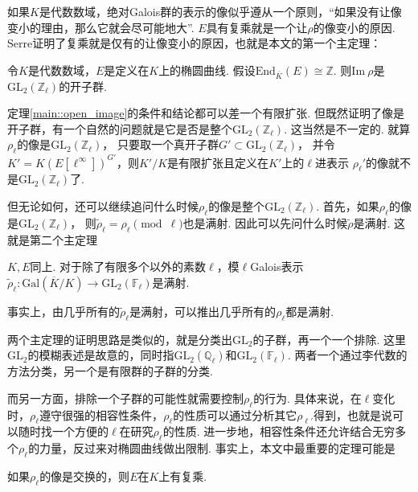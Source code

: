 如果$K$是代数数域，绝对Galois群的表示的像似乎遵从一个原则，“如果没有让像变小的理由，那么它就会尽可能地大”. $E$具有复乘就是一个让$\rho$的像变小的原因. Serre证明了复乘就是仅有的让像变小的原因，也就是本文的第一个主定理：

\begin{cthm}
    令$K$是代数数域，$E$是定义在$K$上的椭圆曲线. 假设$\mathrm{End}_{\overline{K}}(E) \cong \mathbb{Z}$. 则$\mathrm{Im}\ \rho$是$\mathrm{GL}_2(\mathbb{Z}_{\ell})$的开子群. \label{main::open_image}
\end{cthm}

定理\ref{main::open_image}的条件和结论都可以差一个有限扩张.
但既然证明了像是开子群，有一个自然的问题就是它是否是整个$\mathrm{GL}_2(\mathbb{Z}_{\ell})$.
这当然是不一定的. 就算$\rho_{\ell}$的像是$\mathrm{GL}_2(\mathbb{Z}_{\ell})$，
只要取一个真开子群$G'\subset \mathrm{GL}_2(\mathbb{Z}_{\ell})$，
并令$K' = K(E[\ell^{\infty}])^{G'}$，则$K'/K$是有限扩张且定义在$K'$上的$\ell$进表示
$\rho_{\ell}'$的像就不是$\mathrm{GL}_2(\mathbb{Z}_{\ell})$了.

但无论如何，还可以继续追问什么时候$\rho_{\ell}$的像是整个$\mathrm{GL}_2(\mathbb{Z}_{\ell})$.
首先，如果$\rho_{\ell}$的像是$\mathrm{GL}_2(\mathbb{Z}_{\ell})$，
则$\tilde{\rho}_{\ell} = \rho_{\ell} \pmod{\ell}$也是满射.
因此可以先问什么时候$\tilde{\rho}$是满射. 这就是第二个主定理

\begin{cthm}
    $K, E$同上. 对于除了有限多个以外的素数$\ell$，模$\ell$\quad Galois表示$\tilde{\rho}_{\ell}: \mathrm{Gal}(\overline{K}/K)\to \mathrm{GL}_2(\mathbb{F}_{\ell})$是满射. \label{main::surjective}
\end{cthm}

事实上，由几乎所有的$\tilde{\rho}_{\ell}$是满射，可以推出几乎所有的$\rho_{\ell}$都是满射.

两个主定理的证明思路是类似的，就是分类出$\mathrm{GL}_2$的子群，再一个一个排除. 这里$\mathrm{GL}_2$的模糊表述是故意的，同时指$\mathrm{GL}_2(\mathbb{Q}_{\ell})$和$\mathrm{GL}_2(\mathbb{F}_{\ell})$. 两者一个通过李代数的方法分类，另一个是有限群的子群的分类.

而另一方面，排除一个子群的可能性就需要控制$\rho_{\ell}$的行为. 具体来说，在$\ell$变化时，$\rho_{\ell}$遵守很强的相容性条件，$\rho_{\ell}$的性质可以通过分析其它$\rho_{\ell'}$得到，也就是说可以随时找一个方便的$\ell$在研究$\rho_{\ell}$的性质. 进一步地，相容性条件还允许结合无穷多个$\rho_{\ell}$的力量，反过来对椭圆曲线做出限制. 事实上，本文中最重要的定理可能是

\begin{cthm}
    如果$\rho_{\ell}$的像是交换的，则$E$在$K$上有复乘.
\end{cthm}


